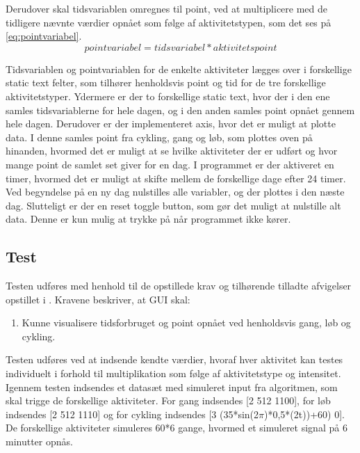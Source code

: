 Derudover skal tidsvariablen omregnes til point, ved at multiplicere med de tidligere nævnte værdier opnået som følge af aktivitetstypen, som det ses på \eqref{eq:pointvariabel}. 
\begin{equation}
\label{eq:pointvariabel}
pointvariabel = tidsvariabel*aktivitetspoint
\end{equation}

Tidsvariablen og pointvariablen for de enkelte aktiviteter lægges over i forskellige static text felter, som tilhører henholdsvis point og tid for de tre forskellige aktivitetstyper. Ydermere er der to forskellige static text, hvor der i den ene samles tidsvariablerne for hele dagen, og i den anden samles point opnået gennem hele dagen. 
Derudover er der implementeret axis, hvor det er muligt at plotte data. I denne samles point fra cykling, gang og løb, som plottes oven på hinanden, hvormed det er muligt at se hvilke aktiviteter der er udført og hvor mange point de samlet set giver for en dag. 
I programmet er der aktiveret en timer, hvormed det er muligt at skifte mellem de forskellige dage efter 24 timer. Ved begyndelse på en ny dag nulstilles alle variabler, og der plottes i den næste dag. Slutteligt er der en reset toggle button, som gør det muligt at nulstille alt data. Denne er kun mulig at trykke på når programmet ikke kører. 

\subsection{Test}
Testen udføres med henhold til de opstillede krav og tilhørende tilladte afvigelser opstillet i . Kravene beskriver, at GUI skal:
\begin{enumerate}
	\item Kunne visualisere tidsforbruget og point opnået ved henholdsvis gang, løb og cykling. 
\end{enumerate}


Testen udføres ved at indsende kendte værdier, hvoraf hver aktivitet kan testes individuelt i forhold til multiplikation som følge af aktivitetstype og intensitet.
Igennem testen indsendes et datasæt med simuleret input fra algoritmen, som skal trigge de forskellige aktiviteter. For gang indsendes [2 512 1100], for løb indsendes [2 512 1110] og for cykling indsendes [3 (35*sin(2$\pi$)*0,5*(2t))+60) 0]. De forskellige aktiviteter simuleres 60*6 gange, hvormed et simuleret signal på 6 minutter opnås.

